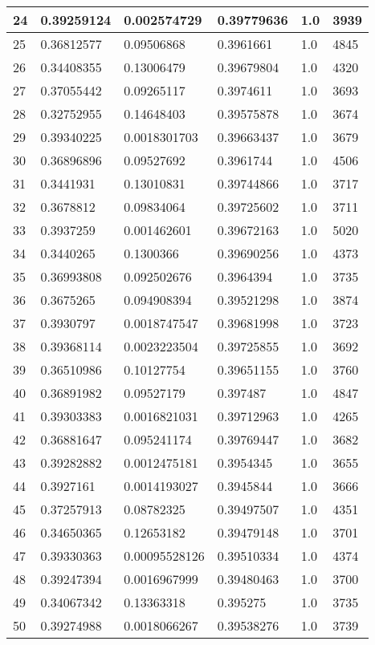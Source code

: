\begin{longtable}{|l|l|l|l|l|l|}
24 & 0.39259124 & 0.002574729 & 0.39779636 & 1.0 & 3939 \\ \hline 
25 & 0.36812577 & 0.09506868 & 0.3961661 & 1.0 & 4845 \\ \hline 
26 & 0.34408355 & 0.13006479 & 0.39679804 & 1.0 & 4320 \\ \hline 
27 & 0.37055442 & 0.09265117 & 0.3974611 & 1.0 & 3693 \\ \hline 
28 & 0.32752955 & 0.14648403 & 0.39575878 & 1.0 & 3674 \\ \hline 
29 & 0.39340225 & 0.0018301703 & 0.39663437 & 1.0 & 3679 \\ \hline 
30 & 0.36896896 & 0.09527692 & 0.3961744 & 1.0 & 4506 \\ \hline 
31 & 0.3441931 & 0.13010831 & 0.39744866 & 1.0 & 3717 \\ \hline 
32 & 0.3678812 & 0.09834064 & 0.39725602 & 1.0 & 3711 \\ \hline 
33 & 0.3937259 & 0.001462601 & 0.39672163 & 1.0 & 5020 \\ \hline 
34 & 0.3440265 & 0.1300366 & 0.39690256 & 1.0 & 4373 \\ \hline 
35 & 0.36993808 & 0.092502676 & 0.3964394 & 1.0 & 3735 \\ \hline 
36 & 0.3675265 & 0.094908394 & 0.39521298 & 1.0 & 3874 \\ \hline 
37 & 0.3930797 & 0.0018747547 & 0.39681998 & 1.0 & 3723 \\ \hline 
38 & 0.39368114 & 0.0023223504 & 0.39725855 & 1.0 & 3692 \\ \hline 
39 & 0.36510986 & 0.10127754 & 0.39651155 & 1.0 & 3760 \\ \hline 
40 & 0.36891982 & 0.09527179 & 0.397487 & 1.0 & 4847 \\ \hline 
41 & 0.39303383 & 0.0016821031 & 0.39712963 & 1.0 & 4265 \\ \hline 
42 & 0.36881647 & 0.095241174 & 0.39769447 & 1.0 & 3682 \\ \hline 
43 & 0.39282882 & 0.0012475181 & 0.3954345 & 1.0 & 3655 \\ \hline 
44 & 0.3927161 & 0.0014193027 & 0.3945844 & 1.0 & 3666 \\ \hline 
45 & 0.37257913 & 0.08782325 & 0.39497507 & 1.0 & 4351 \\ \hline 
46 & 0.34650365 & 0.12653182 & 0.39479148 & 1.0 & 3701 \\ \hline 
47 & 0.39330363 & 0.00095528126 & 0.39510334 & 1.0 & 4374 \\ \hline 
48 & 0.39247394 & 0.0016967999 & 0.39480463 & 1.0 & 3700 \\ \hline 
49 & 0.34067342 & 0.13363318 & 0.395275 & 1.0 & 3735 \\ \hline 
50 & 0.39274988 & 0.0018066267 & 0.39538276 & 1.0 & 3739 \\ \hline 
\end{longtable}